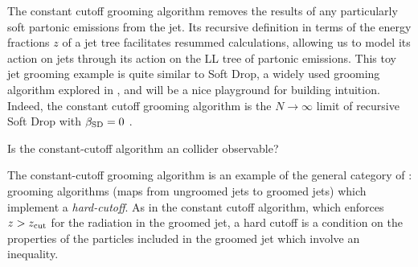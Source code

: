     The constant cutoff grooming algorithm removes the results of any particularly soft partonic emissions from the jet.
    Its recursive definition in terms of the energy fractions \(z\) of a  jet tree facilitates resummed calculations, allowing us to model its action on jets through its action on the LL tree of partonic emissions.
    This toy jet grooming example is quite similar to Soft Drop, a widely used grooming algorithm explored in , and will be a nice playground for building intuition.
    Indeed, the constant cutoff grooming algorithm is the \(N \to \infty\) limit of recursive Soft Drop with \(\beta_\text{SD}=0\) \cite{Dreyer:2018tjj}.

\begin{exercise}{}{}
    Is the \gls{constant-cutoff} algorithm an  collider observable?
\end{exercise}







    The \gls{constant-cutoff} grooming algorithm is an example of the general category of :
    grooming algorithms (maps from ungroomed jets to groomed jets) which implement a \textit{hard-cutoff}.
    As in the constant cutoff algorithm, which enforces \(z > z_{\rm cut}\) for the radiation in the groomed jet, a hard cutoff is a condition on the properties of the particles included in the groomed jet which involve an inequality.


